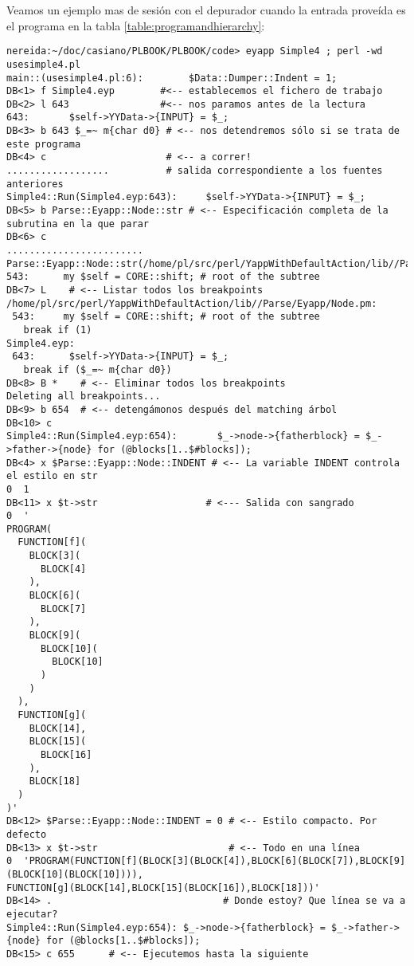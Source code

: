 
Veamos un ejemplo mas de sesión con el depurador cuando la entrada
proveída es el programa en la tabla \ref{table:programandhierarchy}:
\begin{verbatim}
nereida:~/doc/casiano/PLBOOK/PLBOOK/code> eyapp Simple4 ; perl -wd usesimple4.pl
main::(usesimple4.pl:6):        $Data::Dumper::Indent = 1;
DB<1> f Simple4.eyp        #<-- establecemos el fichero de trabajo
DB<2> l 643                #<-- nos paramos antes de la lectura 
643:       $self->YYData->{INPUT} = $_;
DB<3> b 643 $_=~ m{char d0} # <-- nos detendremos sólo si se trata de este programa
DB<4> c                     # <-- a correr!
..................          # salida correspondiente a los fuentes anteriores
Simple4::Run(Simple4.eyp:643):     $self->YYData->{INPUT} = $_;
DB<5> b Parse::Eyapp::Node::str # <-- Especificación completa de la subrutina en la que parar
DB<6> c
........................
Parse::Eyapp::Node::str(/home/pl/src/perl/YappWithDefaultAction/lib//Parse/Eyapp/Node.pm:543):
543:      my $self = CORE::shift; # root of the subtree
DB<7> L    # <-- Listar todos los breakpoints
/home/pl/src/perl/YappWithDefaultAction/lib//Parse/Eyapp/Node.pm:
 543:     my $self = CORE::shift; # root of the subtree
   break if (1)
Simple4.eyp:
 643:      $self->YYData->{INPUT} = $_;
   break if ($_=~ m{char d0})
DB<8> B *    # <-- Eliminar todos los breakpoints
Deleting all breakpoints...
DB<9> b 654  # <-- detengámonos después del matching árbol
DB<10> c
Simple4::Run(Simple4.eyp:654):       $_->node->{fatherblock} = $_->father->{node} for (@blocks[1..$#blocks]);
DB<4> x $Parse::Eyapp::Node::INDENT # <-- La variable INDENT controla el estilo en str
0  1
DB<11> x $t->str                   # <--- Salida con sangrado
0  '
PROGRAM(
  FUNCTION[f](
    BLOCK[3](
      BLOCK[4]
    ),
    BLOCK[6](
      BLOCK[7]
    ),
    BLOCK[9](
      BLOCK[10](
        BLOCK[10]
      )
    )
  ),
  FUNCTION[g](
    BLOCK[14],
    BLOCK[15](
      BLOCK[16]
    ),
    BLOCK[18]
  )
)'
DB<12> $Parse::Eyapp::Node::INDENT = 0 # <-- Estilo compacto. Por defecto
DB<13> x $t->str                       # <-- Todo en una línea
0  'PROGRAM(FUNCTION[f](BLOCK[3](BLOCK[4]),BLOCK[6](BLOCK[7]),BLOCK[9](BLOCK[10](BLOCK[10]))),
FUNCTION[g](BLOCK[14],BLOCK[15](BLOCK[16]),BLOCK[18]))'
DB<14> .                              # Donde estoy? Que línea se va a ejecutar?
Simple4::Run(Simple4.eyp:654): $_->node->{fatherblock} = $_->father->{node} for (@blocks[1..$#blocks]);
DB<15> c 655      # <-- Ejecutemos hasta la siguiente

\end{verbatim}
